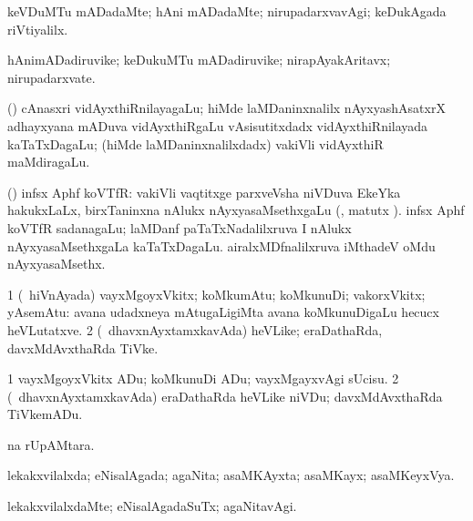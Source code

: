 \bentry
{}
\gl{\kirxvi}
\bmng
keVDuMTu mADadaMte; hAni mADadaMte; nirupadarxvavAgi; keDukAgada riVtiyalilx. 
\emng
\eentry

\bentry
{}
\gl{\nA}
\bmng
hAnimADadiruvike; keDukuMTu mADadiruvike; nirapAyakAritavx; nirupadarxvate. 
\emng
\eentry

\bentry
{}
\gl{\nA}
\bmng
(\ca) cAnasxri vidAyxthiRnilayagaLu; hiMde laMDaninxnalilx nAyxyashAsatxrX adhayxyana mADuva vidAyxthiRgaLu vAsisutitxdadx vidAyxthiRnilayada kaTaTxDagaLu; (hiMde laMDaninxnalilxdadx) vakiVli vidAyxthiR maMdiragaLu. 
\emng
\eentry

\bentry
{}
\gl{\nA}
\bmng
(\birx) infsx Aphf koVTfR: 
\banum
{} vakiVli vaqtitxge parxveVsha niVDuva EkeYka hakukxLaLx, birxTaninxna nAlukx nAyxyasaMsethxgaLu (, matutx ). 
 infsx Aphf koVTfR sadanagaLu; laMDanf paTaTxNadalilxruva I nAlukx nAyxyasaMsethxgaLa kaTaTxDagaLu. 
 airalxMDfnalilxruva iMthadeV oMdu nAyxyasaMsethx. 
\eanum
\emng
\eentry

\bentry
{}
\gl{\nA}
\bmng
\bnum
\num{1} (\sA\ hiVnAyada) vayxMgoyxVkitx; koMkumAtu; koMkunuDi; vakorxVkitx; yAsemAtu:  avana udadxneya mAtugaLigiMta avana koMkunuDigaLu hecucx heVLutatxve. 
\num{2} (\sA\ dhavxnAyxtamxkavAda) heVLike; eraDathaRda, davxMdAvxthaRda TiVke. 
\enum
\emng
\eentry

\bentry
{}
\gl{\akirx}
\bmng
\bnum
\num{1} vayxMgoyxVkitx ADu; koMkunuDi ADu; vayxMgayxvAgi sUcisu. 
\num{2} (\sA\ dhavxnAyxtamxkavAda) eraDathaRda heVLike niVDu; davxMdAvxthaRda TiVkemADu. 
\enum
\emng
\eentry

\bentry
{}
\gl{\nA}
\bmng
{}na rUpAMtara. 
\emng
\eentry

\bentry
{}
\gl{\gu}
\bmng
lekakxvilalxda; eNisalAgada; agaNita; asaMKAyxta; asaMKayx; asaMKeyxVya. 
\emng
\eentry

\bentry
{}
\gl{\kirxvi}
\bmng
lekakxvilalxdaMte; eNisalAgadaSuTx; agaNitavAgi. 
\emng
\eentry

